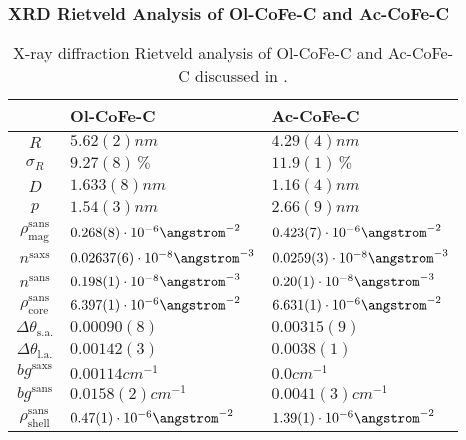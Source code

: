 \documentclass[\main/dresen_thesis.tex]{subfiles}
\begin{document}
  \subsubsection{XRD Rietveld Analysis of Ol-CoFe-C and Ac-CoFe-C}\label{ch:appendix:modelparameters:monolayers:xrd_olac_cofe_c}
  \begin{table}[h]
    \centering
    \caption{\label{tab:appendix:modelparamters:monolayers:nanoparticle:xrd}X-ray diffraction Rietveld analysis of Ol-CoFe-C and Ac-CoFe-C discussed in .}
    \begin{tabular}{ c | l | l }
        & Ol-CoFe-C & Ac-CoFe-C \\
      \hline
      $R$
        & $5.62(2) \unit{nm}$
        & $4.29(4) \unit{nm}$\\
      $\sigma_R$
        & $9.27(8) \,\%$
        & $11.9(1) \,\%$\\
      $D$
        & $1.633(8) \unit{nm}$
        & $1.16(4) \unit{nm}$\\
      $p$
        & $1.54(3) \unit{nm}$
        & $2.66(9) \unit{nm}$\\
      $\rho_\mathrm{mag}^\mathrm{sans}$
        & $0.268(8) \cdot 10^{-6} \angstrom^{-2}$
        & $0.423(7) \cdot 10^{-6} \angstrom^{-2}$\\
      \hline
      $n^\mathrm{saxs}$
        & $0.02637(6) \cdot 10^{-8} \angstrom^{-3}$
        & $0.0259(3) \cdot 10^{-8} \angstrom^{-3}$\\
      $n^\mathrm{sans}$
        & $0.198(1) \cdot 10^{-8} \angstrom^{-3}$
        & $0.20(1) \cdot 10^{-8} \angstrom^{-3}$\\
      $\rho_\mathrm{core}^\mathrm{sans}$
        & $6.397(1) \cdot 10^{-6} \angstrom^{-2}$
        & $6.631(1) \cdot 10^{-6} \angstrom^{-2}$\\
      $\Delta \theta_\mathrm{s. a.}$
        & $0.00090(8)$
        & $0.00315(9)$\\
      $\Delta \theta_\mathrm{l. a.}$
        & $0.00142(3)$
        & $0.0038(1)$\\
      $bg^\mathrm{saxs}$
        & $0.00114 \unit{cm}^{-1}$
        & $0.0 \unit{cm}^{-1}$\\
      $bg^\mathrm{sans}$
        & $0.0158(2) \unit{cm}^{-1}$
        & $0.0041(3) \unit{cm}^{-1}$\\
      $\rho_\mathrm{shell}^\mathrm{sans}$
        & $0.47(1) \cdot 10^{-6} \angstrom^{-2}$
        & $1.39(1) \cdot 10^{-6} \angstrom^{-2}$\\

\end{tabular}
\end{table}
\end{document}
